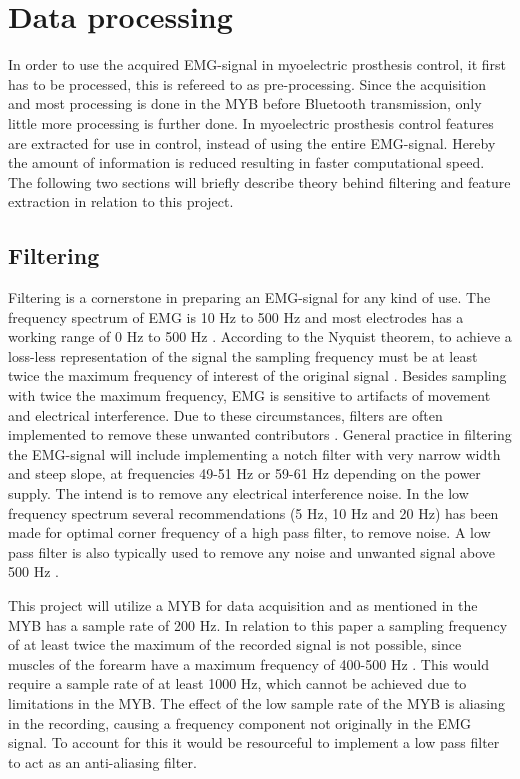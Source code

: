 \section{Data processing} \label{sec:pross}


In order to use the acquired EMG-signal in myoelectric prosthesis control, it first has to be processed, this is refereed to as pre-processing. Since the acquisition and most processing is done in the MYB before Bluetooth transmission, only little more processing is further done. In myoelectric prosthesis control features are extracted for use in control, instead of using the entire EMG-signal. Hereby the amount of information is reduced resulting in faster computational speed. The following two sections will briefly describe theory behind filtering and feature extraction in relation to this project.  


\subsection{Filtering} \label{sub:filt}

Filtering is a cornerstone in preparing an EMG-signal for any kind of use. The frequency spectrum of EMG is 10 Hz to 500 Hz and most electrodes has a working range of 0 Hz to 500 Hz \cite{DeLuca2010}. According to the Nyquist theorem, to achieve a loss-less representation of the signal the sampling frequency must be at least twice the maximum frequency of interest of the original signal \cite{Pozzo2004}. Besides sampling with twice the maximum frequency, EMG is sensitive to artifacts of movement and electrical interference. Due to these circumstances, filters are often implemented to remove these unwanted contributors \cite{DeLuca2010}. 
General practice in filtering the EMG-signal will include implementing a notch filter with very narrow width and steep slope, at frequencies 49-51 Hz or 59-61 Hz depending on the power supply. The intend is to remove any electrical interference noise. In the low frequency spectrum several recommendations (5 Hz, 10 Hz and 20 Hz) has been made for optimal corner frequency of a high pass filter, to remove noise. A low pass filter is also typically used to remove any noise and unwanted signal above 500 Hz \cite{Cram2012}. 

This project will utilize a MYB for data acquisition and as mentioned in  the MYB has a sample rate of 200 Hz. In relation to this paper a sampling frequency of at least twice the maximum of the recorded signal is not possible, since muscles of the forearm have a maximum frequency of 400-500 Hz \cite{Cram2012}. This would require a sample rate of at least 1000 Hz, which cannot be achieved due to limitations in the MYB. The effect of the low sample rate of the MYB is aliasing in the recording, causing a frequency component not originally in the EMG signal. To account for this it would be resourceful to implement a low pass filter to act as an anti-aliasing filter.  

